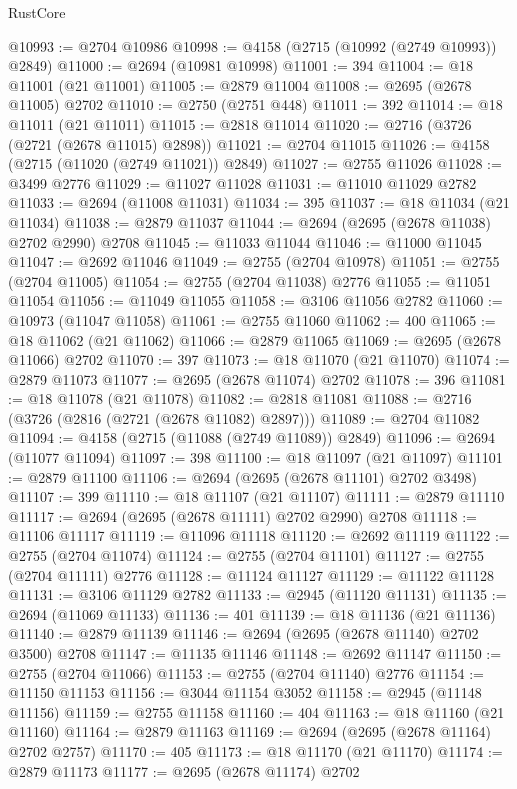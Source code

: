 \begin{lexlean}{RustCore}
\begin{coremodule}
@10993 := @2704 @10986
@10998 := @4158 (@2715 (@10992 (@2749 @10993)) @2849)
@11000 := @2694 (@10981 @10998)
@11001 := 394
@11004 := @18 @11001 (@21 @11001)
@11005 := @2879 @11004
@11008 := @2695 (@2678 @11005) @2702
@11010 := @2750 (@2751 @448)
@11011 := 392
@11014 := @18 @11011 (@21 @11011)
@11015 := @2818 @11014
@11020 := @2716 (@3726 (@2721 (@2678 @11015) @2898))
@11021 := @2704 @11015
@11026 := @4158 (@2715 (@11020 (@2749 @11021)) @2849)
@11027 := @2755 @11026
@11028 := @3499 @2776
@11029 := @11027 @11028
@11031 := @11010 @11029 @2782
@11033 := @2694 (@11008 @11031)
@11034 := 395
@11037 := @18 @11034 (@21 @11034)
@11038 := @2879 @11037
@11044 := @2694 (@2695 (@2678 @11038) @2702 @2990) @2708
@11045 := @11033 @11044
@11046 := @11000 @11045
@11047 := @2692 @11046
@11049 := @2755 (@2704 @10978)
@11051 := @2755 (@2704 @11005)
@11054 := @2755 (@2704 @11038) @2776
@11055 := @11051 @11054
@11056 := @11049 @11055
@11058 := @3106 @11056 @2782
@11060 := @10973 (@11047 @11058)
@11061 := @2755 @11060
@11062 := 400
@11065 := @18 @11062 (@21 @11062)
@11066 := @2879 @11065
@11069 := @2695 (@2678 @11066) @2702
@11070 := 397
@11073 := @18 @11070 (@21 @11070)
@11074 := @2879 @11073
@11077 := @2695 (@2678 @11074) @2702
@11078 := 396
@11081 := @18 @11078 (@21 @11078)
@11082 := @2818 @11081
@11088 := @2716 (@3726 (@2816 (@2721 (@2678 @11082) @2897)))
@11089 := @2704 @11082
@11094 := @4158 (@2715 (@11088 (@2749 @11089)) @2849)
@11096 := @2694 (@11077 @11094)
@11097 := 398
@11100 := @18 @11097 (@21 @11097)
@11101 := @2879 @11100
@11106 := @2694 (@2695 (@2678 @11101) @2702 @3498)
@11107 := 399
@11110 := @18 @11107 (@21 @11107)
@11111 := @2879 @11110
@11117 := @2694 (@2695 (@2678 @11111) @2702 @2990) @2708
@11118 := @11106 @11117
@11119 := @11096 @11118
@11120 := @2692 @11119
@11122 := @2755 (@2704 @11074)
@11124 := @2755 (@2704 @11101)
@11127 := @2755 (@2704 @11111) @2776
@11128 := @11124 @11127
@11129 := @11122 @11128
@11131 := @3106 @11129 @2782
@11133 := @2945 (@11120 @11131)
@11135 := @2694 (@11069 @11133)
@11136 := 401
@11139 := @18 @11136 (@21 @11136)
@11140 := @2879 @11139
@11146 := @2694 (@2695 (@2678 @11140) @2702 @3500) @2708
@11147 := @11135 @11146
@11148 := @2692 @11147
@11150 := @2755 (@2704 @11066)
@11153 := @2755 (@2704 @11140) @2776
@11154 := @11150 @11153
@11156 := @3044 @11154 @3052
@11158 := @2945 (@11148 @11156)
@11159 := @2755 @11158
@11160 := 404
@11163 := @18 @11160 (@21 @11160)
@11164 := @2879 @11163
@11169 := @2694 (@2695 (@2678 @11164) @2702 @2757)
@11170 := 405
@11173 := @18 @11170 (@21 @11170)
@11174 := @2879 @11173
@11177 := @2695 (@2678 @11174) @2702

\end{coremodule}
\end{lexlean}
